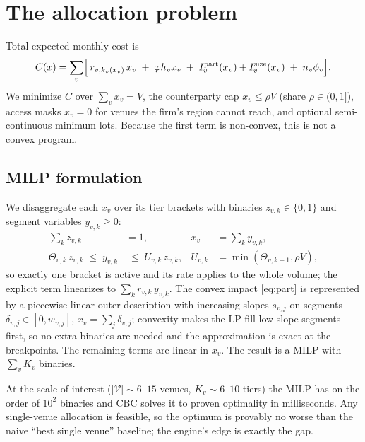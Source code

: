 \documentclass[11pt]{article}
\begin{document}
\section{The allocation problem}
Total expected monthly cost is
\begin{equation}
C(x) = \sum_{v}\Bigl[\, r_{v,k_v(x_v)}\,x_v
\;+\; \varphi h_v x_v
\;+\; I^{\text{part}}_v(x_v) + I^{\text{size}}_v(x_v)
\;+\; n_v\phi_v \Bigr].
\label{eq:total}
\end{equation}
We minimize $C$ over $\sum_v x_v = V$, the counterparty cap
$x_v \le \rho V$ (share $\rho\in(0,1]$), access masks $x_v=0$ for venues the
firm's region cannot reach, and optional semi-continuous minimum lots. Because
the first term is non-convex, this is not a convex program.

\subsection{MILP formulation}
We disaggregate each $x_v$ over its tier brackets with binaries
$z_{v,k}\in\{0,1\}$ and segment variables $y_{v,k}\ge 0$:
\begin{align}
\sum_k z_{v,k} &= 1, & x_v &= \sum_k y_{v,k},\\
\Theta_{v,k}\,z_{v,k} \;\le\; y_{v,k} &\;\le\; U_{v,k}\,z_{v,k},
& U_{v,k}&=\min(\Theta_{v,k+1},\rho V),
\end{align}
so exactly one bracket is active and its rate applies to the whole volume; the
explicit term linearizes to $\sum_k r_{v,k}\,y_{v,k}$. The convex impact
\eqref{eq:part} is represented by a piecewise-linear outer description with
increasing slopes $s_{v,j}$ on segments $\delta_{v,j}\in[0,w_{v,j}]$,
$x_v=\sum_j\delta_{v,j}$; convexity makes the LP fill low-slope segments first,
so no extra binaries are needed and the approximation is exact at the
breakpoints. The remaining terms are linear in $x_v$. The result is a MILP with
$\sum_v K_v$ binaries.

\begin{remark}
At the scale of interest ($|\mathcal V|\!\sim\!6\text{--}15$ venues, $K_v\!\sim\!6\text{--}10$
tiers) the MILP has on the order of $10^2$ binaries and CBC solves it to
proven optimality in milliseconds. Any single-venue allocation is feasible, so
the optimum is provably no worse than the naive ``best single venue''
baseline; the engine's edge is exactly the gap.
\end{remark}
\end{document}

